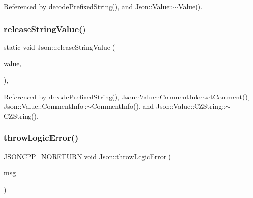 Referenced by decode\+Prefixed\+String(), and Json\+::\+Value\+::$\sim$\+Value().

\mbox{\label{namespaceJson_a3e0d81d514d0e8bddf33b08074214abd_a3e0d81d514d0e8bddf33b08074214abd}} 
\subsubsection{\texorpdfstring{release\+String\+Value()}{releaseStringValue()}}
{\footnotesize\ttfamily static void Json\+::release\+String\+Value (\begin{DoxyParamCaption}\item[{char $\ast$}]{value,  }\item[{unsigned}]{ }\end{DoxyParamCaption})\hspace{0.3cm}{\ttfamily [inline]}, {\ttfamily [static]}}



Referenced by decode\+Prefixed\+String(), Json\+::\+Value\+::\+Comment\+Info\+::set\+Comment(), Json\+::\+Value\+::\+Comment\+Info\+::$\sim$\+Comment\+Info(), and Json\+::\+Value\+::\+C\+Z\+String\+::$\sim$\+C\+Z\+String().

\mbox{\label{namespaceJson_a27790f21f17922fac81e7cd72a5659a5_a27790f21f17922fac81e7cd72a5659a5}} 
\subsubsection{\texorpdfstring{throw\+Logic\+Error()}{throwLogicError()}}
{\footnotesize\ttfamily \hyperlink{json_8h_a78c5ba441d8b48f24a5095b97f01f282_a78c5ba441d8b48f24a5095b97f01f282}{J\+S\+O\+N\+C\+P\+P\+\_\+\+N\+O\+R\+E\+T\+U\+RN} void Json\+::throw\+Logic\+Error (\begin{DoxyParamCaption}\item[{\hyperlink{json_8h_a1e723f95759de062585bc4a8fd3fa4be_a1e723f95759de062585bc4a8fd3fa4be}{J\+S\+O\+N\+C\+P\+P\+\_\+\+S\+T\+R\+I\+NG} const \&}]{msg }\end{DoxyParamCaption})}



